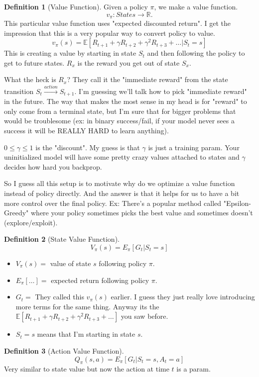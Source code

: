 \documentclass[11pt,notitlepage]{report}
\theoremstyle{definition}
\newtheorem{definition}{Definition}
\theoremstyle{plain}
\begin{document}
\begin{definition}[Value Function]\label{def:value-function}
    Given a policy $\pi$, we make a value function.
    \[v_\pi: States \to \mathbb{R}.\]
    This particular value function uses "expected discounted return". I get the impression that this is
    a very popular way to convert policy to value.
    \[v_\pi(s) = \mathbb{E}\left[R_{t+1} + \gamma R_{t+2} + \gamma^2 R_{t+3} + \ldots \vert S_t = s\right]\]
    This is creating a value by starting in state $S_t$ and then following the policy to get to future states.
    $R_x$ is the reward you get out of state $S_x$.

    What the heck is $R_x$? They call it the "immediate reward" from the state transition $S_t \overset{action}{\to} S_{t+1}$.
    I'm guessing we'll talk how to pick "immediate reward" in the future.
    The way that makes the most sense in my head is for "reward" to only come from a terminal state, but
    I'm sure that for bigger problems that would be troublesome (ex: in binary success/fail, if your model
    never sees a success it will be REALLY HARD to learn anything).
    
    $0 \leq \gamma \leq 1$ is the "discount". My guess is that $\gamma$ is just a training param.
    Your uninitialized model will have some pretty crazy values attached to states and $\gamma$ decides
    how hard you backprop.
\end{definition}

So I guess all this setup is to motivate why do we optimize a value function instead of policy directly.
And the answer is that it helps for us to have a bit more control over the final policy.
Ex: There's a popular method called "Epsilon-Greedy" where your policy sometimes picks the best
value and sometimes doesn't (explore/exploit).

\begin{definition}[State Value Function]
    \[V_\pi(s) = E_\pi\left[G_t\vert S_t = s\right]\]
    \begin{itemize}
    \item $V_\pi(s) =$ value of state $s$ following policy $\pi$.
    \item $E_\pi\left[\ldots\right] =$ expected return following policy $\pi$.
    \item $G_t =$ They called this $v_\pi(s)$ earlier. I guess they just really
    love introducing more terms for the same thing. Anyway its the 
    $\mathbb{E}\left[R_{t+1} + \gamma R_{t+2} + \gamma^2 R_{t+3} + \ldots\right]$ you saw before.
    \item $S_t = s$ means that I'm starting in state $s$.
    \end{itemize}
\end{definition}
\begin{definition}[Action Value Function]\label{def:action-value-function}
    \[Q_\pi(s,a) = E_\pi\left[G_t\vert S_t = s, A_t = a\right]\]
    Very similar to state value but now the action at time $t$ is a param.
\end{definition}
\end{document}
